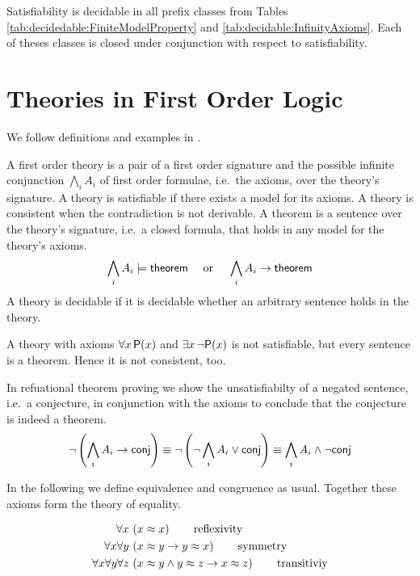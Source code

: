 \begin{lemma}
	Satisfiability is decidable \cite{MR1482227} in all prefix classes from Tables 
	\ref{tab:decidedable:FiniteModelProperty} and \ref{tab:decidable:InfinityAxioms}.
	Each of theses classes is closed under conjunction with respect to satisfiability.
\end{lemma}



\section{Theories in First Order Logic}\label{sec:decidable:fol:theories}

We follow definitions and examples in \cite{AM2015L}.

\begin{definition}[Theory]
	A {\myem first order theory} is a pair of a first order signature 
	and the possible infinite conjunction $\bigwedge_i A_i$ of first order formulae, 
	i.e.~the axioms, over the theory's signature. 
	A theory is satisfiable if there exists a model for its axioms.
	A theory is consistent when the contradiction is not derivable.
%	
	A {\myem theorem} is a sentence over the theory's signature, 
	i.e.~a closed formula, that holds in any model for the theory's axioms.
	\[
		\bigwedge_i A_i \models \mathsf{theorem} 
		\quad\text{ or }\quad
		\bigwedge_i A_i \rightarrow \mathsf{theorem} 
	\]
	A theory is decidable if it is decidable whether an arbitrary sentence holds in the theory.
\end{definition}

\begin{example}
A theory with axioms $\forall x\,{\mathsf P}(x)$ and $\exists x\,\lnot{\mathsf P}(x)$ is not satisfiable,
but every sentence is a theorem. Hence it is not consistent, too.
\end{example}
%
\begin{remark} 
In refuational theorem proving
we show the unsatisfiabilty 
of a negated sentence, 
i.e.~a {\myem conjecture},
in conjunction with the axioms
to conclude that the conjecture is indeed a theorem.
\[
	\lnot\left(\bigwedge_i A_i \rightarrow \mathsf{conj}\right) \equiv
	\lnot\left(\lnot\bigwedge_i A_i \lor \mathsf{conj}\right) \equiv
	\bigwedge_i A_i \land \lnot \mathsf{conj}
\]
\end{remark}

In the following we define equivalence and congruence as usual. Together these axioms form the theory of equality.

\begin{definition}
	[Equivalence]
	\label{def:equivalence:axioms}
\begin{align*}
\forall x\, 
&\left(x \approx x\right) 
\tag*{reflexivity}
\\
\forall x \forall y\, 
&\left(x \approx y \rightarrow y \approx x \right)
\tag*{symmetry} 
\\
\forall x \forall y \forall z\,
&\left(x \approx y \land y\approx z \rightarrow x\approx z\right) 
\tag*{transitiviy}
\end{align*}
\end{definition}

